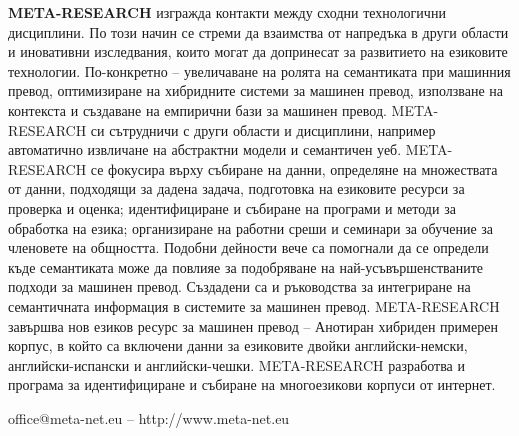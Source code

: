 \documentclass[]{../../metanetpaper}
\begin{document}
\begin{multicols}{2}
\textbf{META-RESEARCH} изгражда контакти между сходни технологични
дисциплини. По този начин се стреми да взаимства от напредъка в други
области и иновативни изследвания, които могат да допринесат за
развитието на езиковите технологии.  По-конкретно -- увеличаване на
ролята на семантиката при машинния превод, оптимизиране на хибридните
системи за машинен превод, използване на контекста и създаване на
емпирични бази за машинен превод. META-RESEARCH си сътрудничи с други
области и дисциплини, например автоматично извличане на абстрактни
модели и семантичен уеб.  META-RESEARCH се фокусира върху събиране на
данни, определяне на множествата от данни, подходящи за дадена задача,
подготовка на езиковите ресурси за проверка и оценка; идентифициране и
събиране на програми и методи за обработка на езика; организиране на
работни среши и семинари за обучение за членовете на
общността. Подобни дейности вече са помогнали да се определи къде
семантиката може да повлияе за подобряване на най-усъвършенстваните
подходи за машинен превод. Създадени са и ръководства за интегриране
на семантичната информация в системите за машинен
превод. META-RESEARCH завършва нов езиков ресурс за машинен превод –
Анотиран хибриден примерен корпус, в който са включени данни за
езиковите двойки английски-немски, английски-испански и
английски-чешки.  META-RESEARCH разработва и програма за
идентифициране и събиране на многоезикови корпуси от интернет.
\end{multicols}

\vfill
\centerline{office@meta-net.eu -- http://www.meta-net.eu}


\setcounter{section}{0}
\setcounter{figure}{0}

\cleardoublepage


\end{document}
